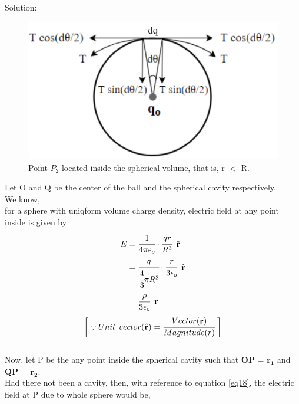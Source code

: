 Solution:
\begin{figure}
     \centering 
     \includegraphics[scale = 0.46]{figures/elecmag/tnsnrng.png}
     \caption{Point $P_2$ located inside the spherical volume, that is, r $<$ R. }
     \label{tnsrng}
 \end{figure}
 Let O and Q be the center of the ball and the spherical cavity respectively.\\
 We know,\\
 for a sphere with uniqform volume charge   density, electric field at any point inside is given by
 \begin{align}
     E &= \cfrac{1}{4 \pi \epsilon_o}\cdot \cfrac{qr}{R^3}\hspace{5pt} \hat{\textbf{r}} \nonumber \\
     &= \cfrac{q}{\cfrac{4}{3}\pi R^3} \cdot \cfrac{r}{3 \epsilon_o} \hspace{5pt}\hat{\textbf{r}} \nonumber \\
     &= \cfrac{\rho}{3 \epsilon_o} \hspace{5pt}\bm{\textbf{r}} \label{eq18}
 \end{align}
 \[ \bigg[\because Unit\hspace{4pt}vector (\hat{\textbf{r}}) = \cfrac{Vector (\bm{\textbf{r}})}{Magnitude (r)} \hspace{3pt}\bigg]\]
 \\
 \vfill
Now, let P be the any point inside the spherical cavity such that $\bm{OP}$ = $\bm{r_1}$ and $\bm{QP}$ = $\bm{r_2}$.
\vspace{3pt}
\\
Had there not been a cavity, then, with reference to equation \ref{eq18}, the electric field at P due to whole sphere would be, 

